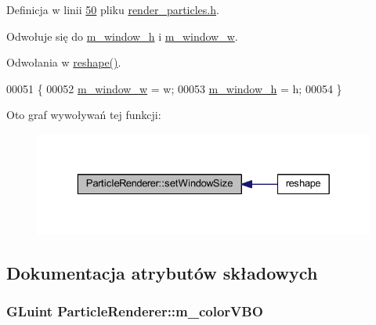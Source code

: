Definicja w linii \hyperlink{render__particles_8h_source_l00050}{50} pliku \hyperlink{render__particles_8h_source}{render\-\_\-particles.\-h}.



Odwołuje się do \hyperlink{render__particles_8h_source_l00068}{m\-\_\-window\-\_\-h} i \hyperlink{render__particles_8h_source_l00068}{m\-\_\-window\-\_\-w}.



Odwołania w \hyperlink{particles_8cpp_source_l00532}{reshape()}.


\begin{DoxyCode}
00051         \{
00052             \hyperlink{class_particle_renderer_aa71b7eba5d5665a086b7ba80adddf19b}{m\_window\_w} = w;
00053             \hyperlink{class_particle_renderer_af34b1e93f6a7f22774a6473c52027d77}{m\_window\_h} = h;
00054         \}
\end{DoxyCode}


Oto graf wywoływań tej funkcji\-:\nopagebreak
\begin{figure}[H]
\begin{center}
\leavevmode
\includegraphics[width=329pt]{class_particle_renderer_ad84b464475e5ebd42cfed6e2e91e7247_icgraph}
\end{center}
\end{figure}




\subsection{Dokumentacja atrybutów składowych}
\hypertarget{class_particle_renderer_a7dcaa73a41c598207974432206b423b5}{
\subsubsection[{m\-\_\-color\-V\-B\-O}]{\setlength{\rightskip}{0pt plus 5cm}G\-Luint Particle\-Renderer\-::m\-\_\-color\-V\-B\-O\hspace{0.3cm}{\ttfamily [protected]}}}\label{class_particle_renderer_a7dcaa73a41c598207974432206b423b5}


